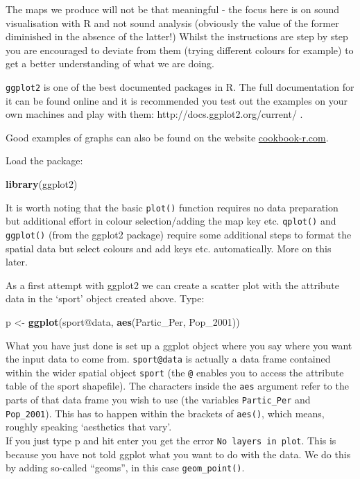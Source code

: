 \documentclass[]{article}
\newenvironment{Shaded}{}{}
\newcommand{\KeywordTok}[1]{\textcolor[rgb]{0.00,0.44,0.13}{\textbf{{#1}}}}
\newcommand{\NormalTok}[1]{{#1}}
\begin{document}
The maps we produce will not be that meaningful - the focus here is on
sound visualisation with R and not sound analysis (obviously the value
of the former diminished in the absence of the latter!) Whilst the
instructions are step by step you are encouraged to deviate from them
(trying different colours for example) to get a better understanding of
what we are doing.

\texttt{ggplot2} is one of the best documented packages in R. The full
documentation for it can be found online and it is recommended you test
out the examples on your own machines and play with them:
http://docs.ggplot2.org/current/ .

Good examples of graphs can also be found on the website
\href{http://www.cookbook-r.com/Graphs/}{cookbook-r.com}.

Load the package:

\begin{Shaded}
\begin{Highlighting}[]
\KeywordTok{library}\NormalTok{(ggplot2)}
\end{Highlighting}
\end{Shaded}
It is worth noting that the basic \texttt{plot()} function requires no
data preparation but additional effort in colour selection/adding the
map key etc. \texttt{qplot()} and \texttt{ggplot()} (from the ggplot2
package) require some additional steps to format the spatial data but
select colours and add keys etc. automatically. More on this later.

As a first attempt with ggplot2 we can create a scatter plot with the
attribute data in the `sport' object created above. Type:

\begin{Shaded}
\begin{Highlighting}[]
\NormalTok{p <- }\KeywordTok{ggplot}\NormalTok{(sport@data, }\KeywordTok{aes}\NormalTok{(Partic_Per, Pop_2001))}
\end{Highlighting}
\end{Shaded}
What you have just done is set up a ggplot object where you say where
you want the input data to come from. \texttt{sport@data} is actually a
data frame contained within the wider spatial object \texttt{sport} (the
\texttt{@} enables you to access the attribute table of the sport
shapefile). The characters inside the \texttt{aes} argument refer to the
parts of that data frame you wish to use (the variables
\texttt{Partic\_Per} and \texttt{Pop\_2001}). This has to happen within
the brackets of \texttt{aes()}, which means, roughly speaking
`aesthetics that vary'.\\If you just type p and hit enter you get the
error \texttt{No layers in plot}. This is because you have not told
ggplot what you want to do with the data. We do this by adding so-called
``geoms'', in this case \texttt{geom\_point()}.
\end{document}
